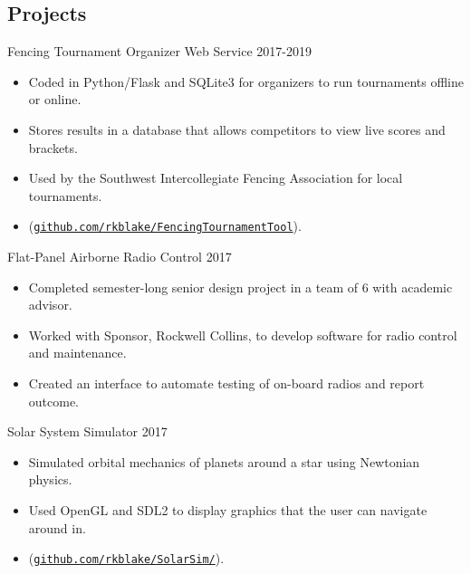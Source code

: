 \documentclass[line,margin]{res}
\begin{document}
\begin{resume}
\vspace{-4pt}
\section{Projects}
\vspace{12pt}


Fencing Tournament Organizer Web Service
\hfill 2017-2019
	\begin{itemize} \itemsep -2pt
		\item Coded in Python/Flask and SQLite3 for organizers to run tournaments offline or online.
		\item Stores results in a database that allows competitors to view live scores and brackets.
		\item Used by the Southwest Intercollegiate Fencing Association for local tournaments.
		\item (\href{https://github.com/rkblake/FencingTournamentTool}{\texttt{github.com/rkblake/FencingTournamentTool}}).
	\end{itemize}

\vspace{-8pt}
Flat-Panel Airborne Radio Control
\hfill 2017
	\begin{itemize} \itemsep -2pt
		\item Completed semester-long senior design project in a team of 6 with academic advisor.
		\item Worked with Sponsor, Rockwell Collins, to develop software for radio control and maintenance.
		\item Created an interface to automate testing of on-board radios and report outcome.
	\end{itemize}

\vspace{-8pt}
Solar System Simulator
\hfill 2017
	\begin{itemize} \itemsep -2pt
		\item Simulated orbital mechanics of planets around a star using Newtonian physics.
		\item Used OpenGL and SDL2 to display graphics that the user can navigate around in.
		\item (\href{https://github.com/rkblake/SolarSim/}{\texttt{github.com/rkblake/SolarSim/}}).
	\end{itemize}


\end{resume}
\end{document}
